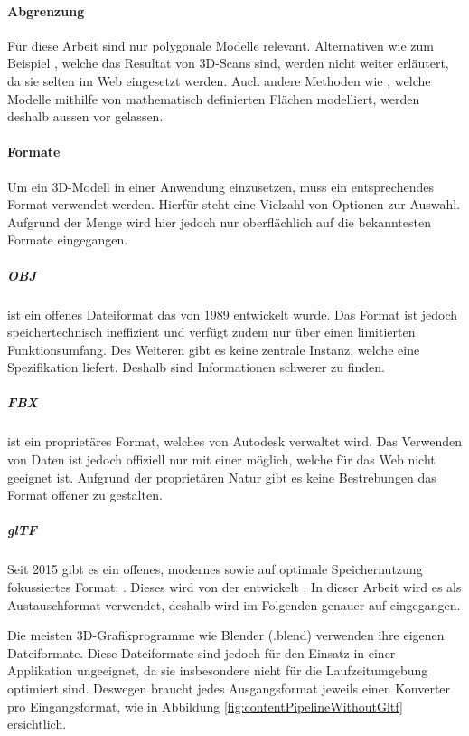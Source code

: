 \paragraph{Abgrenzung}
Für diese Arbeit sind nur polygonale Modelle relevant.
Alternativen wie zum Beispiel , welche das Resultat von 3D-Scans sind, werden nicht weiter erläutert, da sie selten im Web eingesetzt werden. Auch andere Methoden wie , welche Modelle mithilfe von mathematisch definierten Flächen modelliert, werden deshalb aussen vor gelassen.

\paragraph{Formate}
Um ein 3D-Modell in einer Anwendung einzusetzen, muss ein entsprechendes Format verwendet werden. Hierfür steht eine Vielzahl von Optionen zur Auswahl. Aufgrund der Menge wird hier jedoch nur oberflächlich auf die bekanntesten Formate eingegangen.

\subparagraph{OBJ}
 ist ein offenes Dateiformat das von  1989 entwickelt wurde. Das Format ist jedoch speichertechnisch ineffizient und verfügt zudem nur über einen limitierten Funktionsumfang. Des Weiteren gibt es keine zentrale Instanz, welche eine Spezifikation liefert. Deshalb sind Informationen schwerer zu finden. \cite{objSpec}

\subparagraph{FBX}
 ist ein proprietäres Format, welches von Autodesk verwaltet wird. Das Verwenden von  Daten ist jedoch offiziell nur mit einer  möglich, welche für das Web nicht geeignet ist. Aufgrund der proprietären Natur gibt es keine Bestrebungen das Format offener zu gestalten.

\subparagraph{glTF}
Seit 2015 gibt es ein offenes, modernes sowie auf optimale Speichernutzung fokussiertes Format: . Dieses wird von der  entwickelt \cite{gltf1Spec}. In dieser Arbeit wird es als Austauschformat verwendet, deshalb wird im Folgenden genauer auf  eingegangen.

Die meisten 3D-Grafikprogramme wie Blender (.blend) verwenden ihre eigenen Dateiformate. Diese Dateiformate sind jedoch für den Einsatz in einer Applikation ungeeignet, da sie insbesondere nicht für die Laufzeitumgebung optimiert sind. Deswegen braucht jedes Ausgangsformat jeweils einen Konverter pro Eingangsformat, wie in Abbildung \ref{fig:contentPipelineWithoutGltf} ersichtlich.

